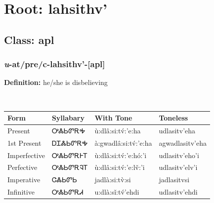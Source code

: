 \needspace{4in}
\section*{Root: lahsithv'}
\nopagebreak
{}
\needspace{3in}
\subsection*{Class: apl}
\nopagebreak
\needspace{2in}
\subsubsection*{\textit{u}{-}at/pre/c{-}\textbf{lahsithv'}{-}[apl]}
\nopagebreak
\textbf{Definition: } he/she is disbelieving
\\[0.5em]
\begin{tabularx}{\textwidth}{l X X X}%
\toprule%
\textbf{Form}&\textbf{Syllabary}&\textbf{With Tone}&\textbf{Toneless}\\%
\midrule%
Present&ᎤᏜᏏᏛᎡᎭ&ù:dlâ:si:tv́:’e:ha&udlasitv’eha\\%
1st Present&ᎠᏆᏜᏏᏛᎡᎭ&à:gwadlâ:si:tv́:’e:ha&agwadlasitv’eha\\%
Imperfective&ᎤᏜᏏᏛᎡᎰᎢ&ù:dlâ:si:tv́:’e:hó:’i&udlasitv’eho’i\\%
Perfective&ᎤᏜᏏᏛᎡᎸᎢ&ù:dlâ:si:tv́:’e:lv̌:’i&udlasitv’elv’i\\%
Imperative&ᏣᏜᏏᏛᏏ&jadlà:si:tv̀:si&jadlasitvsi\\%
Infinitive&ᎤᏜᏏᏛᎡᏗ&u:dlà:sǐ:tv́’ehdi&udlasitv’ehdi\\%
\bottomrule%
\end{tabularx}
\\[1em]